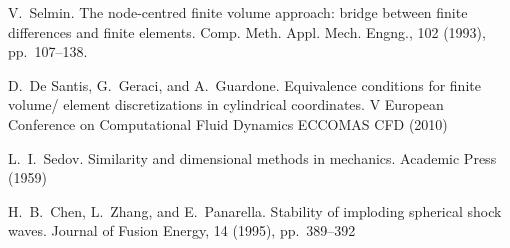 
\begin{thebibliography}{10}

{\sc V.~Selmin}. {The node-centred finite volume approach: bridge between finite differences and finite elements}. Comp. Meth. Appl. Mech. Engng., 102 (1993), pp.~107--138.

{\sc D.~De Santis, G.~Geraci, and A.~Guardone}. {Equivalence conditions for finite volume/ element discretizations in cylindrical coordinates}. V European Conference on Computational Fluid Dynamics ECCOMAS CFD (2010)

{\sc L.~I.~Sedov}. {Similarity and dimensional methods in mechanics}. Academic Press (1959)
	
{\sc H.~B.~Chen, L.~Zhang, and E.~Panarella}. {Stability of imploding spherical shock waves}. Journal of Fusion Energy, 14 (1995), pp.~389--392

\end{thebibliography}